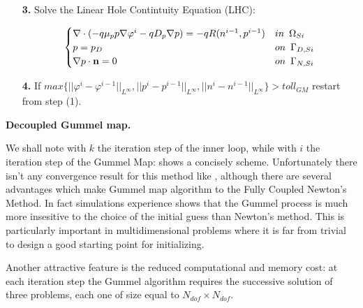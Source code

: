 {\begin{itemize}
\vspace{-0.5cm}

\begin{equation}
\label{eq: LEC system}
\begin{cases}
 \nabla \cdot ( q\mu_n n \nabla \varphi^i - qD_n \nabla n ) = -qR(n^{i-1},p^{i-1}) & in \psp{3} \Omega_{Si}
 \\
 n = n_D & on \psp{3} \Gamma_{D,Si}
 \\
 \nabla n \cdot \vect{n} = 0 & on \psp{3} \Gamma_{N,Si}
\end{cases}
\end{equation}

\item[\bf 3.] Solve the Linear Hole Contintuity Equation (LHC):

\vspace{-0.5cm}

\begin{equation}
\label{eq: LHC system}
\begin{cases}
\nabla \cdot (- q\mu_p p \nabla \varphi^i - qD_p \nabla p ) =  -qR(n^{i-1},p^{i-1}) & in \psp{3} \Omega_{Si}
\\
 p = p_D & on \psp{3} \Gamma_{D,Si}
 \\
 \nabla p \cdot \vect{n} = 0 & on \psp{3} \Gamma_{N,Si}
\end{cases}
\end{equation}

\item[\bf 4.] If $max\{||\varphi^i-\varphi^{i-1}||_{L^{\infty}},||p^i-p^{i-1}||_{L^{\infty}},||n^i-n^{i-1}||_{L^{\infty}}\}>toll_{GM}$ restart from step (1).


\end{itemize}

}{\textbf{Decoupled Gummel map.}}

We shall note with $k$ the iteration step of the inner loop, while with $i$ the iteration step of the Gummel Map:  shows a concisely scheme.
Unfortunately there isn't any convergence result for this method like , although there are several advantages which make Gummel map algorithm to the Fully Coupled Newton's Method.
In fact simulations experience shows that the Gummel process is much more insesitive to the choice of the initial guess than Newton's method. This is particularly important in multidimensional problems where it is far from trivial to design a good starting point for initializing.

Another attractive feature is the reduced computational and memory cost: at each iteration step the Gummel algorithm requires the successive solution of three problems, each one of size equal to $N_{dof}\times N_{dof}$.





